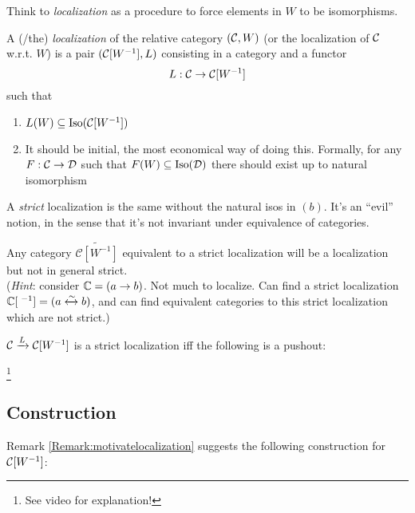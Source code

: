 \documentclass[class=report, crop=false,a4paper,twoside]{standalone}
\begin{document}
Think to \emph{localization} as a procedure to force elements in $W$ to be isomorphisms.
\begin{definition}
	A (/the) \emph{localization} of the relative category $(\mathcal{C},W)$ (or the localization of $\mathcal{C}$ w.r.t. $W$) is a pair $(\mathcal{C}[W^{-1}] , L)$ consisting in a category and a functor
	\[
	L: \mathcal{C} \to \mathcal{C}[W^{-1}]
	\]
	such that
	\begin{enumerate}
		\item $L(W) \subseteq \operatorname{Iso}(\mathcal{C}[W^{-1}])$
		\item It should be initial, the most economical way of doing this. Formally, for any $F: \mathcal{C} \to \mathcal{D}$ such that $F(W) \subseteq \operatorname{Iso}(\mathcal{D})$ there should exist up to natural isomorphism
		\begin{center}
		\end{center}
	\end{enumerate}
	A \emph{strict} localization is the same without the natural isos in $(b)$. It's an ``evil'' notion, in the sense that it's not invariant under equivalence of categories.
\end{definition}

	\begin{exercise}
	Any category $\widetilde{\mathcal{C}[W^{-1}]}$ equivalent to a strict localization will be a localization but not in general strict.
	\\
	(\emph{Hint}: consider $\mathbb{C} = (a \to b)$. Not much to localize. Can find a strict localization $\C[\phantom.^{-1}] = (a \xleftrightarrow{\sim} b)$, and can find equivalent categories to this strict localization which are not strict.)
	\end{exercise}

\begin{remark}\label{Remark:motivatelocalization}
	$\mathcal{C} \xrightarrow{L} \mathcal{C}[W^{-1}]$ is a strict localization iff the following is a pushout:
	
	\footnote{See video for explanation!}
\end{remark}

\subsection{Construction}
Remark \ref{Remark:motivatelocalization} suggests the following construction for $\mathcal{C}[W^{-1}]$:
\end{document}
